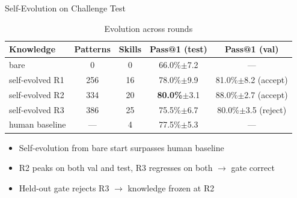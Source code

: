 \documentclass{beamer}
\begin{document}
\begin{frame}{Self-Evolution on Challenge Test}
    \begin{table}[h]
        \centering
        \caption{Evolution across rounds}
        \footnotesize
        \begin{tabular}{lcccc}
            \toprule
            Knowledge & Patterns & Skills & Pass@1 (test) & Pass@1 (val) \\
            \midrule
            bare & 0 & 0 & 66.0\%$\pm$7.2 & --- \\
            self-evolved R1 & 256 & 16 & 78.0\%$\pm$9.9 & 81.0\%$\pm$8.2 (accept) \\
            self-evolved R2 & 334 & 20 & \textbf{80.0\%}$\pm$3.1 & 88.0\%$\pm$2.7 (accept) \\
            self-evolved R3 & 386 & 25 & 75.5\%$\pm$6.7 & 80.0\%$\pm$3.5 (reject) \\
            \midrule
            human baseline & --- & 4 & 77.5\%$\pm$5.3 & --- \\
            \bottomrule
        \end{tabular}
    \end{table}
    \vspace{4pt}
    \begin{itemize}
        \item Self-evolution from bare start surpasses human baseline
        \item R2 peaks on both val and test, R3 regresses on both $\to$ gate correct
        \item Held-out gate rejects R3 $\to$ knowledge frozen at R2
    \end{itemize}
\end{frame}
\end{document}
